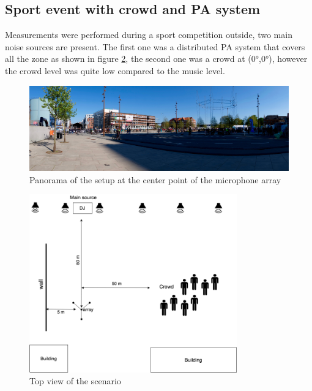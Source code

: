 \subsection{Sport event with crowd and PA system }
Measurements were performed during a sport competition outside, two main noise sources are present. The first one was a distributed PA system that covers all the zone as shown in figure \ref{fig:Scenario1diagram}, the second one was a crowd at (0°,0°), however the crowd level was quite low compared to the music level.
\begin{figure}[H]
    \centering
    \includegraphics[width=1\textwidth]{Figures/bmxracepic.jpg}
    \caption{Panorama of the setup at the center point of the microphone array}
    \label{fig:Scenario3}
\end{figure}
\begin{figure}[H]
    \centering
    \includegraphics[width=0.8\textwidth]{Figures/bmxrace1.png}
    \caption{Top view of the scenario}
    \label{fig:Scenario1diagram}
\end{figure}
